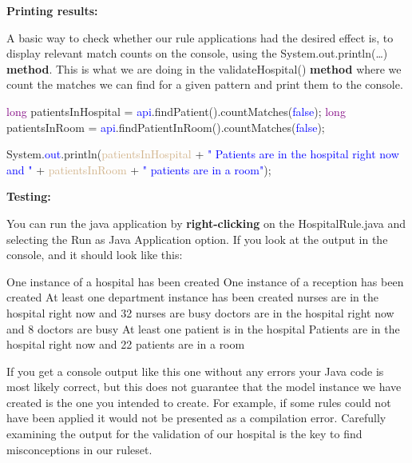 {\textbf{Printing results:}

A basic way to check whether our rule applications had the desired effect is, to display relevant match counts on the console, using the \textsf{System.out.println(…)} \textbf{method}. This is what we are doing in the \textsf{validateHospital()} \textbf{method} where we count the matches we can find for a given pattern and print them to the console.\newline

{

\textcolor{Purple}{long} patientsInHospital = \textcolor{blue}{api}.findPatient().countMatches(\textcolor{blue}{false});\newline
\textcolor{Purple}{long} patientsInRoom = \textcolor{blue}{api}.findPatientInRoom().countMatches(\textcolor{blue}{false});\newline

System.\textcolor{blue}{out}.println(\textcolor{Tan}{patientsInHospital} + \textcolor{blue}{" Patients are in the hospital right now and "} + \textcolor{Tan}{patientsInRoom} + \textcolor{blue}{" patients are in a room"});\newline\newline
	
}

\textbf{Testing:}

You can run the java application by \textbf{right-clicking} on the \textsf{HospitalRule.java} and selecting the \textsf{Run as Java Application} option. If you look at the output in the console, and it should look like this:\newline

{

\textsf{One instance of a hospital has been created\newline
One instance of a reception has been created\newline
At least one department instance has been created nurses are in the hospital right now and 32 nurses are busy doctors are in the hospital right now and 8 doctors are busy\newline
At least one patient is in the hospital Patients are in the hospital right now and 22 patients are in a room}\newline

}

If you get a console output like this one without any errors your Java code is most likely correct, but this does not guarantee that the model instance we have created is the one you intended to create.\newline
For example, if some rules could not have been applied it would not be presented as a compilation error. Carefully examining the output for the validation of our hospital is the key to find misconceptions in our ruleset.

}
